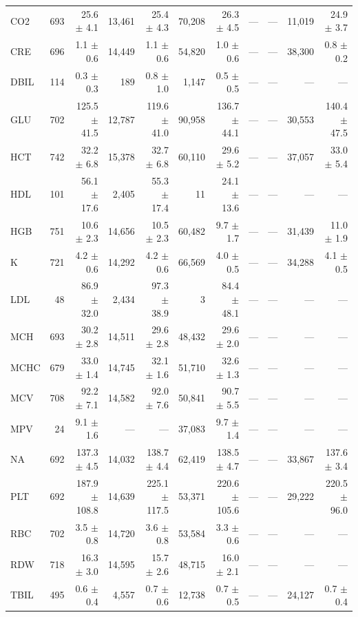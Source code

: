 \begin{table}[ht]
\begin{tabular}{lrrrrrrrrrr}
CO2 & 693 & 25.6 $\pm$ 4.1 & 13,461 & 25.4 $\pm$ 4.3 & 70,208 & 26.3 $\pm$ 4.5 & --- & --- & 11,019 & 24.9 $\pm$ 3.7 \\
CRE & 696 & 1.1 $\pm$ 0.6 & 14,449 & 1.1 $\pm$ 0.6 & 54,820 & 1.0 $\pm$ 0.6 & --- & --- & 38,300 & 0.8 $\pm$ 0.2 \\
DBIL & 114 & 0.3 $\pm$ 0.3 & 189 & 0.8 $\pm$ 1.0 & 1,147 & 0.5 $\pm$ 0.5 & --- & --- & --- & --- \\
GLU & 702 & 125.5 $\pm$ 41.5 & 12,787 & 119.6 $\pm$ 41.0 & 90,958 & 136.7 $\pm$ 44.1 & --- & --- & 30,553 & 140.4 $\pm$ 47.5 \\
HCT & 742 & 32.2 $\pm$ 6.8 & 15,378 & 32.7 $\pm$ 6.8 & 60,110 & 29.6 $\pm$ 5.2 & --- & --- & 37,057 & 33.0 $\pm$ 5.4 \\
HDL & 101 & 56.1 $\pm$ 17.6 & 2,405 & 55.3 $\pm$ 17.4 & 11 & 24.1 $\pm$ 13.6 & --- & --- & --- & --- \\
HGB & 751 & 10.6 $\pm$ 2.3 & 14,656 & 10.5 $\pm$ 2.3 & 60,482 & 9.7 $\pm$ 1.7 & --- & --- & 31,439 & 11.0 $\pm$ 1.9 \\
K & 721 & 4.2 $\pm$ 0.6 & 14,292 & 4.2 $\pm$ 0.6 & 66,569 & 4.0 $\pm$ 0.5 & --- & --- & 34,288 & 4.1 $\pm$ 0.5 \\
LDL & 48 & 86.9 $\pm$ 32.0 & 2,434 & 97.3 $\pm$ 38.9 & 3 & 84.4 $\pm$ 48.1 & --- & --- & --- & --- \\
MCH & 693 & 30.2 $\pm$ 2.8 & 14,511 & 29.6 $\pm$ 2.8 & 48,432 & 29.6 $\pm$ 2.0 & --- & --- & --- & --- \\
MCHC & 679 & 33.0 $\pm$ 1.4 & 14,745 & 32.1 $\pm$ 1.6 & 51,710 & 32.6 $\pm$ 1.3 & --- & --- & --- & --- \\
MCV & 708 & 92.2 $\pm$ 7.1 & 14,582 & 92.0 $\pm$ 7.6 & 50,841 & 90.7 $\pm$ 5.5 & --- & --- & --- & --- \\
MPV & 24 & 9.1 $\pm$ 1.6 & --- & --- & 37,083 & 9.7 $\pm$ 1.4 & --- & --- & --- & --- \\
NA & 692 & 137.3 $\pm$ 4.5 & 14,032 & 138.7 $\pm$ 4.4 & 62,419 & 138.5 $\pm$ 4.7 & --- & --- & 33,867 & 137.6 $\pm$ 3.4 \\
PLT & 692 & 187.9 $\pm$ 108.8 & 14,639 & 225.1 $\pm$ 117.5 & 53,371 & 220.6 $\pm$ 105.6 & --- & --- & 29,222 & 220.5 $\pm$ 96.0 \\
RBC & 702 & 3.5 $\pm$ 0.8 & 14,720 & 3.6 $\pm$ 0.8 & 53,584 & 3.3 $\pm$ 0.6 & --- & --- & --- & --- \\
RDW & 718 & 16.3 $\pm$ 3.0 & 14,595 & 15.7 $\pm$ 2.6 & 48,715 & 16.0 $\pm$ 2.1 & --- & --- & --- & --- \\
TBIL & 495 & 0.6 $\pm$ 0.4 & 4,557 & 0.7 $\pm$ 0.6 & 12,738 & 0.7 $\pm$ 0.5 & --- & --- & 24,127 & 0.7 $\pm$ 0.4 \\

\end{tabular}
\end{table}
